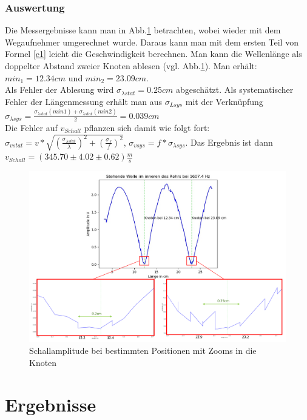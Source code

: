 \documentclass[]{article}
\begin{document}
	\subsubsection{Auswertung}
	
	Die Messergebnisse kann man in Abb.\ref{Vc_Roh} betrachten, wobei wieder mit dem Wegaufnehmer umgerechnet wurde. Daraus kann man mit dem ersten Teil von Formel \ref{e1} leicht die Geschwindigkeit berechnen. Man kann die Wellenlänge als doppelter Abstand zweier Knoten ablesen (vgl. Abb.\ref{Vc_Roh}). Man erhält: $min_1=12.34cm$ und $min_2=23.09cm$.\\ 
	Als Fehler der Ablesung wird $\sigma_{\lambda stat}=0.25cm$ abgeschätzt. Als systematischer Fehler der Längenmessung erhält man aus $\sigma_{Lsys}$ mit der Verknüpfung $\sigma_{\lambda sys} = \frac{\sigma_{\lambda stat}(min1)+\sigma_{\lambda stat}(min2)}{2}=0.039cm$\\
	Die Fehler auf $v_{Schall}$ pflanzen sich damit wie folgt fort: $\sigma_{vstat}=v*\sqrt{(\frac{\sigma_{\lambda stat}}{\lambda})^2+(\frac{\sigma_f}{f})^2}$, 
	$\sigma_{vsys}=f*\sigma_{\lambda sys}$.
	Das Ergebnis ist dann $v_{Schall}=(345.70 \pm 4.02 \pm 0.62)\frac{m}{s}$
	
	\begin{figure}
	\begin{center}
		\includegraphics[scale=0.65]{Images/Zoom_vollst.png}
		\caption{Schallamplitude bei bestimmten Positionen mit Zooms in die Knoten}
		\label{Vc_Roh}
	\end{center}
	\end{figure}
	

	\section{Ergebnisse}
\end{document}

